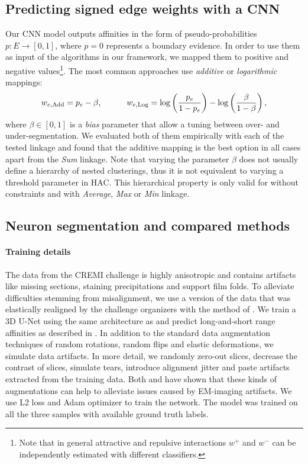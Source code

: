 \subsection{Predicting signed edge weights with a CNN}
Our CNN model outputs affinities in the form of pseudo-probabilities $p:E \rightarrow [0,1]$, where $p=0$ represents a boundary evidence. In order to use them as input of the algorithms in our framework, we mapped them to positive and negative values\footnote{Note that in general attractive and repulsive interactions $w^+$ and $w^-$ can be independently estimated with different classifiers.}. The most common approaches use \emph{additive} \cite{ailon2008aggregating} or \emph{logarithmic} \cite{finkel2008enforcing,andres2012globally} mappings:
\begin{equation} \label{eq:mappings}
w_{e,\mathrm{Add}} = p_e - \beta, \qquad \quad w_{e,\mathrm{Log}} = \log \left( \frac{p_e}{1-p_e} \right) - \log \left( \frac{\beta}{1-\beta} \right),
\end{equation}
where $\beta \in [0,1]$ is a \emph{bias} parameter that allow a tuning between over- and under-segmentation. We evaluated both of them empirically with each of the tested linkage and found that the additive mapping is the best option in all cases apart from the \emph{Sum} linkage. Note that varying the parameter $\beta$ does not usually define a hierarchy of nested clusterings, thus it is not equivalent to varying a threshold parameter in HAC. This hierarchical property is only valid for \algname{} without constraints and with \emph{Average}, \emph{Max} or \emph{Min} linkage.



\subsection{Neuron segmentation and compared methods}\label{sec:cremi_details}
\paragraph{Training details} The data from the CREMI challenge is highly anisotropic and contains artifacts like missing sections, staining precipitations and support film folds. 
To alleviate difficulties stemming from misalignment, we use a version of the data that was elastically realigned by the challenge organizers with the method of \cite{saalfeld2012elastic}.
We train a 3D U-Net \cite{ronneberger2015u, cciccek20163d} using the same architecture as \cite{funke2018large} and predict long-and-short range affinities 
as described in \cite{lee2017superhuman}. In addition to the standard data augmentation techniques of random rotations, random flips and  elastic deformations, we simulate data artifacts.
In more detail, we randomly zero-out slices, decrease the contrast of slices, simulate tears, introduce alignment jitter and paste artifacts extracted from the training data. Both \cite{funke2018large} and \cite{lee2017superhuman} have shown
that these kinds of augmentations can help to alleviate issues caused by EM-imaging artifacts.
We use L2 loss and Adam optimizer to train the network. The model was trained on all the three samples with available ground truth labels.  

